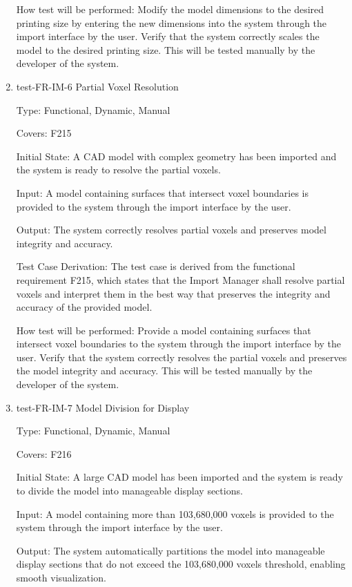 \documentclass[12pt, titlepage]{article}
\begin{document}
\begin{enumerate}
How test will be performed: Modify the model dimensions to the desired printing size by entering the new dimensions into the system through the import interface by the user. Verify that the system correctly scales the model to the desired printing size. This will be tested manually by the developer of the system.

\item{test-FR-IM-6 Partial Voxel Resolution\\}

Type: Functional, Dynamic, Manual

Covers: F215
					
Initial State: A CAD model with complex geometry has been imported and the system is ready to resolve the partial voxels.
					
Input: A model containing surfaces that intersect voxel boundaries is provided to the system through the import interface by the user.
					
Output: The system correctly resolves partial voxels and preserves model integrity and accuracy.

Test Case Derivation: The test case is derived from the functional requirement F215, which states that the Import Manager shall resolve partial voxels and interpret them in the best way that preserves the integrity and accuracy of the provided model.
					
How test will be performed: Provide a model containing surfaces that intersect voxel boundaries to the system through the import interface by the user. Verify that the system correctly resolves the partial voxels and preserves the model integrity and accuracy. This will be tested manually by the developer of the system.

\item{test-FR-IM-7 Model Division for Display\\}

Type: Functional, Dynamic, Manual

Covers: F216
					
Initial State: A large CAD model has been imported and the system is ready to divide the model into manageable display sections.
					
Input: A model containing more than 103,680,000 voxels is provided to the system through the import interface by the user.
					
Output: The system automatically partitions the model into manageable display sections that do not exceed the 103,680,000 voxels threshold, enabling smooth visualization.


\end{enumerate}
\end{document}
